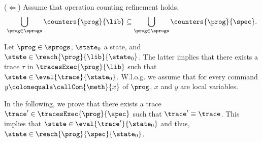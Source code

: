 
%

($\Leftarrow$)
Assume that operation counting refinement holds, \ie
\begin{equation}\label{eq:count1}
\bigcup_{\prog\in\sprogs}\counters{\prog}{\lib}\subseteq \bigcup_{\prog\in\sprogs}\counters{\prog}{\spec}.
\end{equation}

Let $\prog\in\sprogs$, $\state_0$ a state, and $\state\in \reach{\prog}{\lib}{\state_0}$.
The latter implies that there exists a trace $\tau$ in $\tracesExec{\prog}{\lib}$ such that 
$\state\in \eval{\trace}{\state_0}$. W.l.o.g. we assume that for every command $y \colonequals \callCom{\meth}{x}$ of 
$\prog$, $x$ and $y$ are local variables.

In the following, we prove that there exists a trace $\trace'\in\tracesExec{\prog}{\spec}$ such that $\trace'\equiv\trace$. 
This implies that $\state\in \eval{\trace'}{\state_0}$ and thus, $\state\in \reach{\prog}{\spec}{\state_0}$.

